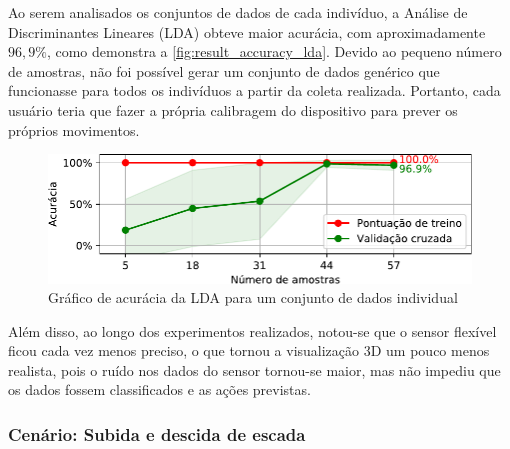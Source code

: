 Ao serem analisados os conjuntos de dados de cada indivíduo, a Análise de Discriminantes Lineares (LDA) obteve maior acurácia, com aproximadamente \(96{,}9\%\), como demonstra a \autoref{fig:result_accuracy_lda}. Devido ao pequeno número de amostras, não foi possível gerar um conjunto de dados genérico que funcionasse para todos os indivíduos a partir da coleta realizada. Portanto, cada usuário teria que fazer a própria calibragem do dispositivo para prever os próprios movimentos.

\begin{figure}[ht]
	\caption{\label{fig:result_accuracy_lda}Gráfico de acurácia da LDA para um conjunto de dados individual}
	\begin{center}
	    \includegraphics[width=\textwidth]{resources/result_accuracy_lda}
	\end{center}
\end{figure}




Além disso, ao longo dos experimentos realizados, notou-se que o sensor flexível ficou cada vez menos preciso, o que tornou a visualização 3D um pouco menos realista, pois o ruído nos dados do sensor tornou-se maior, mas não impediu que os dados fossem classificados e as ações previstas.

\subsubsection{Cenário: Subida e descida de escada}

